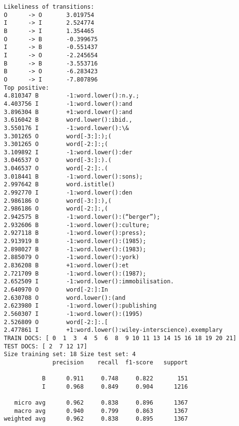 \documentclass[11pt]{article}
\begin{document}
\begin{Verbatim}[commandchars=\\\{\}]
Likeliness of transitions:
O      -> O       3.019754
I      -> I       2.524774
B      -> I       1.354465
O      -> B       -0.399675
I      -> B       -0.551437
I      -> O       -2.245654
B      -> B       -3.553716
B      -> O       -6.283423
O      -> I       -7.807896
Top positive:
4.810347 B        -1:word.lower():n.y.;
4.403756 I        -1:word.lower():and
3.896304 B        +1:word.lower():and
3.616042 B        word.lower():ibid.,
3.550176 I        -1:word.lower():\&
3.301265 O        word[-3:]:);(
3.301265 O        word[-2:]:;(
3.109892 I        -1:word.lower():der
3.046537 O        word[-3:]:).(
3.046537 O        word[-2:]:.(
3.018441 B        -1:word.lower():sons);
2.997642 B        word.istitle()
2.992770 I        -1:word.lower():den
2.986186 O        word[-3:]:),(
2.986186 O        word[-2:]:,(
2.942575 B        -1:word.lower():(“berger”);
2.932606 B        -1:word.lower():culture;
2.927118 B        -1:word.lower():press);
2.913919 B        -1:word.lower():(1985);
2.898027 B        -1:word.lower():(1983);
2.885079 O        -1:word.lower():york)
2.836208 B        +1:word.lower():et
2.721709 B        -1:word.lower():(1987);
2.652509 I        -1:word.lower():immobilisation.
2.640970 O        word[-2:]:In
2.630708 O        word.lower():(and
2.623980 I        -1:word.lower():publishing
2.560307 I        -1:word.lower():(1995)
2.526809 O        word[-2:]:.[
2.477861 I        +1:word.lower():wiley-interscience).exemplary
TRAIN DOCS: [ 0  1  3  4  5  6  8  9 10 11 13 14 15 16 18 19 20 21] TEST DOCS: [ 2  7 12 17]
Size training set: 18 Size test set: 4
              precision    recall  f1-score   support

           B      0.911     0.748     0.822       151
           I      0.968     0.849     0.904      1216

   micro avg      0.962     0.838     0.896      1367
   macro avg      0.940     0.799     0.863      1367
weighted avg      0.962     0.838     0.895      1367


\end{Verbatim}
\end{document}
